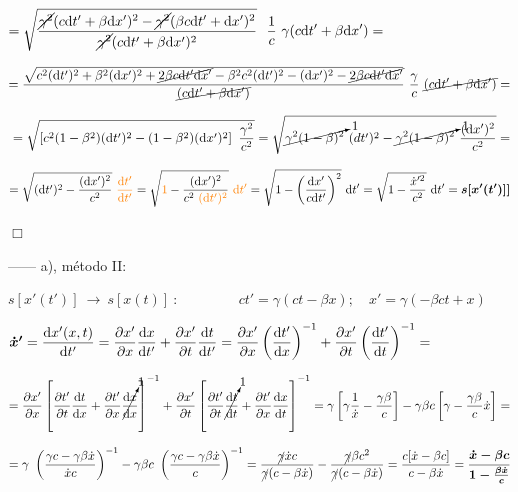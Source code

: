 $\displaystyle = \sqrt{\dfrac{ \cancel{\gamma^2} (c \dd t'+\beta \dd x')^2 -  \cancel{\gamma^2} (\beta c \dd t'+\dd x')^2}{\cancel{\gamma^2} (c\dd t'+\beta \dd x')^2}  }\  \ \dfrac 1 c \ \gamma (c\dd t'+\beta \dd x')= $

$\displaystyle = \dfrac{\sqrt{
c^2(\dd t')^2 +\beta^2 (\dd x')^2 + \cancel{2\beta c \dd t' \dd x'} - \beta^2 c^2 (\dd t')^2-(\dd x')^2- \cancel{2\beta c \dd t' \dd x'}
}}{\cancel{(c\dd t'+\beta \dd x')}} \ \dfrac \gamma c \ \cancel{(c\dd t'+\beta \dd x')}=$

$\ = \displaystyle \sqrt{\left[ c^2(1-\beta^2)(\dd t')^2 - (1-\beta^2)(\dd x')^2 \right] \ \dfrac {\gamma^2}{c^2}} =
\sqrt{\cancelto{1}{ \gamma^2(1-\beta)^2} \ (dt')^2 - \cancelto{1}{ \gamma^2(1-\beta)^2} \ \dfrac{(\dd x')^2}{c^2} } =$

$\displaystyle = \sqrt{(\dd t')^2 - \dfrac{(\dd x')^2}{c^2}}\  \textcolor{orange}{\dfrac{\dd t'}{\dd t'}} = 
\sqrt{\textcolor{orange}{1} - \dfrac{(\dd x')^2}{c^2 \ \textcolor{orange}{(\dd t')^2}}} \ \textcolor{orange}{\dd t'}= \sqrt{1-\left( \dfrac {\dd x'}{c\dd t'} \right)^2} \ \dd t'= \sqrt{1-\dfrac{\dot x'^2}{c^2}} \ \dd t'= \boldsymbol{ s[x'(t')]]}$

\vspace{-5mm}
\begin{flushright}
$\boldsymbol{ \Box } \ $	
\end{flushright}

------ a), método II:

$s[x'(t')] \ \to \ s[x(t)] \ :\ \qquad \qquad ct'=\gamma(ct-\beta x);\quad x'=\gamma(-\beta c t+x)$

$\boldsymbol{\dot x'} = \displaystyle \dv{x'(x,t)}{t'}= \pdv{x'}{x}\dv{x}{t'}+\pdv{x'}{t}\dv{t}{t'}=\pdv{x'}{x} \left( \dv{t'}{x} \right)^{-1} + \pdv{x'}{t} \left( \dv{t'}{t} \right)^{-1}=$

$\displaystyle = \pdv{x'}{x} \left[ 
\pdv{t'}{t} \dv{t}{x} + \pdv{t'}{x} \cancelto{1}{\dv{x}{x}}
 \right]^{-1}
+ \pdv{x'}{t} \left[ 
\pdv{t'}{t}\cancelto{1}{\dv{t}{t}}+\pdv{t'}{x}\dv{x}{t}
\right]^{-1} = \gamma \left[\gamma \dfrac 1 {\dot x} -\dfrac{\gamma \beta}{c} \right]-\gamma \beta c \left[ \gamma-\dfrac{\gamma \beta}{c}\dot x \right]=$ 

$=\displaystyle \gamma \ \left( \dfrac{\gamma c-\gamma \beta \dot x}{\dot x c} \right)^{-1} - \gamma \beta c \ \left( \dfrac{\gamma c - \gamma \beta \dot x}{c} \right)^{-1}=   \dfrac{\cancel{\gamma} \dot x c}{\cancel{\gamma}(c-\beta \dot x)}-\dfrac{\cancel{\gamma} \beta c^2}{\cancel{\gamma}(c-\beta \dot x)}=\dfrac{c[\dot x - \beta c]}{c-\beta \dot x}=\boldsymbol{ \dfrac{\dot x - \beta c}{1-\frac{\beta \dot x}{c}}}$

